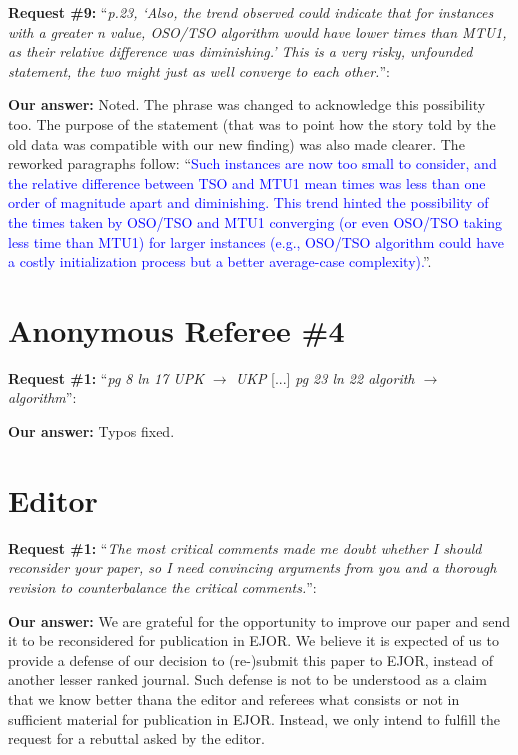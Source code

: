 \documentclass{elsarticle}
\begin{document}
\textbf{Request \#9:} ``\textit{p.23, `Also, the trend observed could indicate that for instances with a greater n value, OSO/TSO algorithm would have lower times than MTU1, as their relative difference was diminishing.' This is a very risky, unfounded statement, the two might just as well converge to each other.}'': 

\textbf{Our answer:} Noted. The phrase was changed to acknowledge this possibility too. The purpose of the statement (that was to point how the story told by the old data was compatible with our new finding) was also made clearer. The reworked paragraphs follow: ``\textcolor{blue}{Such instances are now too small to consider, and the relative difference between TSO and MTU1 mean times was less than one order of magnitude apart and diminishing. This trend hinted the possibility of the times taken by OSO/TSO and MTU1 converging (or even OSO/TSO taking less time than MTU1) for larger instances (e.g., OSO/TSO algorithm could have a costly initialization process but a better average-case complexity).}''.
\medskip

\section{Anonymous Referee \#4}

\textbf{Request \#1:} ``\textit{pg 8 ln 17 UPK \(\rightarrow\) UKP} [...] \textit{pg 23 ln 22 algorith \(\rightarrow\) algorithm}'': 

\textbf{Our answer:} Typos fixed.

\section{Editor}

\textbf{Request \#1:} ``\textit{The most critical comments made me doubt whether I should reconsider your paper, so I need convincing arguments from you and a thorough revision to counterbalance the critical comments.}'': 

\textbf{Our answer:} We are grateful for the opportunity to improve our paper and send it to be reconsidered for publication in EJOR. 
We believe it is expected of us to provide a defense of our decision to (re-)submit this paper to EJOR, instead of another lesser ranked journal.
Such defense is not to be understood as a claim that we know better thana the editor and referees what consists or not in sufficient material for publication in EJOR.
Instead, we only intend to fulfill the request for a rebuttal asked by the editor.
\end{document}
